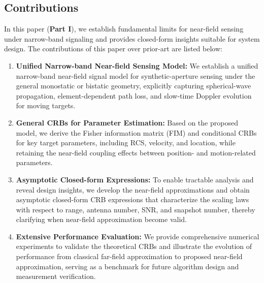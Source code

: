\documentclass[9pt,final,journal,twocolumn]{IEEEtran}
\begin{document}
\subsection{Contributions}
\vspace{-0.1cm}
In this paper (\textbf{Part I}), we establish fundamental limits for near-field sensing under narrow-band signaling and provides closed-form insights suitable for system design. The contributions of this paper over prior-art are listed below:
\begin{enumerate}
   \item  \textbf{Unified Narrow-band Near-field  Sensing Model:} We establish a unified narrow-band near-field signal model for synthetic-aperture sensing under the general monostatic or bistatic geometry, explicitly capturing spherical-wave propagation, element-dependent path loss, and slow-time Doppler evolution for moving targets.
   \item  \textbf{General CRBs for Parameter Estimation:} Based on the proposed model, we derive the Fisher information matrix (FIM) and conditional CRBs for key target parameters, including RCS, velocity, and location, while retaining the near-field coupling effects between position- and motion-related parameters. 
   \item  \textbf{Asymptotic Closed-form Expressions:}  To enable tractable analysis and reveal design insights, we develop the near-field approximations and obtain asymptotic closed-form CRB expressions that characterize the scaling laws with respect to range, antenna number, SNR, and snapshot number, thereby clarifying when near-field approximation become valid.
   \item  \textbf{Extensive Performance Evaluation:} 
   We provide comprehensive numerical experiments to validate the theoretical CRBs and illustrate the evolution of performance from classical far-field approximation to proposed near-field approximation, serving as a benchmark for future algorithm design and measurement verification.
\end{enumerate}

\vspace{-0.3cm}
\end{document}
